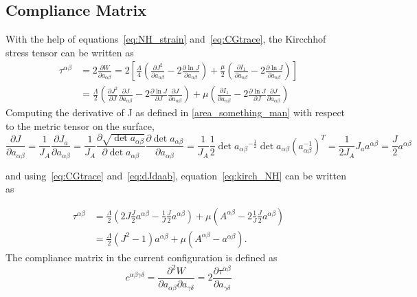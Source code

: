 \documentclass[../main.tex]{subfiles}
\begin{document}
\begin{appendices}
    \subsection{Compliance Matrix} \label{appendices:compliance_matrix_curvy}
With the help of equations~\eqref{eq:NH_strain} and~\eqref{eq:CGtrace}, the Kircchhof stress tensor can be written as
\begin{equation}\label{eq:kirch_NH}
    \begin{split}
        \tau^{\alpha \beta} &= 2 \frac{\partial W}{\partial a_{\alpha \beta}} = 2 \left[ \frac{\Lambda}{4} \left( \frac{\partial J^{2}}{\partial a_{\alpha \beta}} - 2 \frac{\partial \ln{J}}{\partial a_{\alpha \beta}} \right) + \frac{\mu}{2} \left( \frac{\partial I_{1}}{\partial a_{\alpha \beta}} - 2 \frac{\partial \ln{J}}{\partial a_{\alpha \beta}} \right) \right] \\ &= \frac{\Lambda}{2} \left( \frac{\partial J^{2}}{\partial J} \frac{\partial J}{\partial a_{\alpha \beta}} - 2 \frac{\partial \ln{J}}{\partial J} \frac{\partial J}{\partial a_{\alpha \beta}} \right) + \mu \left( \frac{\partial I_{1}}{\partial a_{\alpha \beta}} - 2 \frac{\partial \ln{J}}{\partial J} \frac{\partial J}{\partial a_{\alpha \beta}} \right) 
    \end{split}
\end{equation}
Computing the derivative of J as defined in \eqref{area_something_man} with respect to the metric tensor on the surface,
\begin{equation}\label{eq:dJdaab}
    \frac{\partial J}{\partial a_{\alpha \beta}} = \frac{1}{J_{A}} \frac{\partial J_{a}}{\partial a_{\alpha \beta}} = \frac{1}{J_{A}} \frac{\partial \sqrt{\det{a_{\alpha \beta}}}}{\partial \det{a_{\alpha \beta}}} \frac{\partial \det{a_{\alpha \beta}}}{\partial a_{\alpha \beta}} = \frac{1}{J_{A}} \frac{1}{2} \det{a_{\alpha \beta}}^{-\frac{1}{2}} \det{a_{\alpha \beta}} \left( a_{\alpha \beta}^{-1} \right)^{T} = \frac{1}{2 J_{A}} J_{a} a^{\alpha \beta} = \frac{J}{2} a^{\alpha \beta}
\end{equation}

and using~\eqref{eq:CGtrace} and~\eqref{eq:dJdaab}, equation~\eqref{eq:kirch_NH} can be written as

\begin{equation}\label{eq:kirch_NH_2}
    \begin{split}
        \tau^{\alpha \beta} &= \frac{\Lambda}{2} \left( 2 J \frac{J}{2} a^{\alpha \beta} - \frac{1}{J} \frac{J}{2} a^{\alpha \beta} \right) + \mu \left( A^{\alpha \beta} - 2 \frac{1}{J} \frac{J}{2} a^{\alpha \beta} \right) \\ &= \frac{\Lambda}{2} \left( J^{2} - 1 \right) a^{\alpha \beta} + \mu \left( A^{\alpha \beta} - a^{\alpha \beta} \right).
    \end{split}
\end{equation}
The compliance matrix in the current configuration is defined as
\begin{equation}\label{eq:cabgd}
    c^{\alpha \beta \gamma \delta} = \frac{\partial^{2} W}{\partial a_{\alpha \beta} \partial a_{\gamma \delta}} = 2 \frac{\partial \tau^{\alpha \beta}}{\partial a_{\gamma \delta}}
\end{equation}


\end{appendices}
\end{document}
